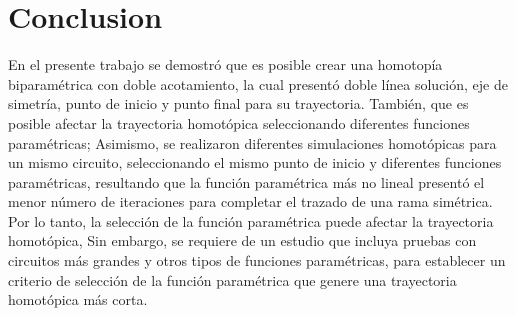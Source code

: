 \documentclass[conference,letterpaper,twocolumn]{IEEEtran}
\begin{document}
\section{Conclusion}

En el presente trabajo se demostró que es posible crear una homotopía biparamétrica con doble acotamiento,
la cual presentó doble línea solución, eje de simetría, punto de inicio y punto final para su trayectoria.
También, que es posible afectar la trayectoria homotópica seleccionando diferentes funciones paramétricas;
Asimismo, se realizaron diferentes simulaciones homotópicas para un mismo circuito, seleccionando
el mismo punto de inicio y diferentes funciones paramétricas, resultando que la función paramétrica más no lineal
presentó el menor número de iteraciones para completar el trazado de una rama simétrica. Por lo tanto, la selección de la función paramétrica puede afectar la trayectoria homotópica, Sin embargo, se requiere de un estudio que incluya pruebas con circuitos más grandes y otros tipos de funciones paramétricas,  para establecer un criterio de selección de la función paramétrica que
genere una trayectoria homotópica más corta.



\end{document}
